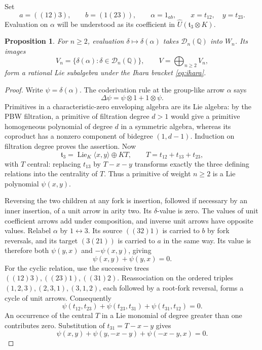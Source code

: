 \documentclass[11pt]{article}
\newtheorem{proposition}[theorem]{Proposition}
\theoremstyle{definition}
\theoremstyle{remark}
\numberwithin{equation}{section}
\begin{document}
Set
\[
 a=((12)3),\qquad b=(1(23)),\qquad
 \alpha=1_{ab},\qquad x=t_{12},\quad y=t_{23}.
\]
Evaluation on $\alpha$ will be understood as its coefficient in
$\widehat U(\mathfrak t_3\otimes K)$.

\begin{proposition}\label{prop:categorical-values}
For $n\geq2$, evaluation $\delta\mapsto\delta(\alpha)$ takes
$\mathcal D_n(\mathbb Q)$ into $W_n$.  Its images
\[
 V_n=\{\delta(\alpha):\delta\in\mathcal D_n(\mathbb Q)\},\qquad
 V=\bigoplus_{n\geq2}V_n,
\]
form a rational Lie subalgebra under the Ihara bracket \eqref{eq:ihara}.
\end{proposition}

\begin{proof}
Write $\psi=\delta(\alpha)$.  The coderivation rule at the group-like
arrow $\alpha$ says
\[
 \Delta\psi=\psi\otimes1+1\otimes\psi.
\]
Primitives in a characteristic-zero enveloping algebra are its Lie
algebra: by the PBW filtration, a primitive of filtration degree
$d>1$ would give a primitive homogeneous polynomial of degree $d$ in a
symmetric algebra, whereas its coproduct has a nonzero component of
bidegree $(1,d-1)$.  Induction on filtration degree proves the assertion.
Now
\begin{equation}\label{eq:category-three-split}
 \mathfrak t_3=\operatorname{Lie}_K\langle x,y\rangle\oplus K T,
 \qquad T=t_{12}+t_{13}+t_{23},
\end{equation}
with $T$ central: replacing $t_{13}$ by $T-x-y$ transforms exactly the
three defining relations into the centrality of $T$.  Thus a primitive
of weight $n\geq2$ is a Lie polynomial $\psi(x,y)$.

Reversing the two children at any fork is insertion, followed if
necessary by an inner insertion, of a unit arrow in arity two.  Its
$\delta$-value is zero.  The values of unit coefficient arrows add under
composition, and inverse unit arrows have opposite values.  Relabel
$\alpha$ by $1\leftrightarrow3$.  Its source $((32)1)$ is carried to $b$
by fork reversals, and its target $(3(21))$ is carried to $a$ in the same
way.  Its value is therefore both $\psi(y,x)$ and $-\psi(x,y)$, giving
\begin{equation}\label{eq:category-antisymmetry}
 \psi(x,y)+\psi(y,x)=0.
\end{equation}
For the cyclic relation, use the successive trees
$((12)3),((23)1),((31)2)$.  Reassociation on the ordered triples
$(1,2,3),(2,3,1),(3,1,2)$, each followed by a root-fork reversal,
forms a cycle of unit arrows.  Consequently
\[
 \psi(t_{12},t_{23})+\psi(t_{23},t_{31})+
 \psi(t_{31},t_{12})=0.
\]
An occurrence of the central $T$ in a Lie monomial of degree greater
than one contributes zero.  Substitution of $t_{31}=T-x-y$ gives
\begin{equation}\label{eq:category-cyclic}
 \psi(x,y)+\psi(y,-x-y)+\psi(-x-y,x)=0.
\end{equation}


\end{proof}
\end{document}
